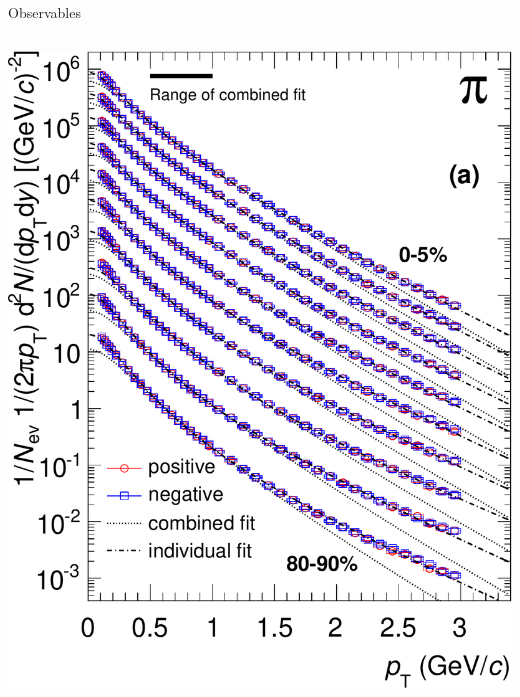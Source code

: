 \documentclass{beamer}
\begin{document}
\begin{frame}{Observables}
\begin{columns}
    \includegraphics[height=.25\textheight]{exptfigs/spectra} \\

\end{columns}
\end{frame}
\end{document}
